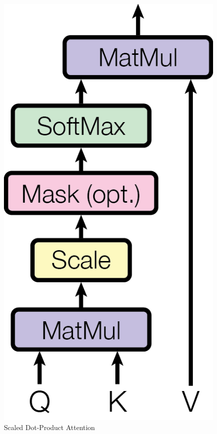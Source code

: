 \documentclass[diploma]{nanolab2015}
\begin{document}
\begin{figure}[ht]
    \centering
    \includegraphics[scale=0.2]{./assets/self-attention.png}
    \caption{Scaled Dot-Product Attention\cite{book10}}
    \label{pic3}
\end{figure}
\end{document}
